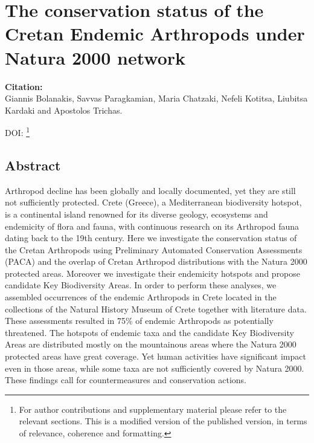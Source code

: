 % 
% 


\chapter{The conservation status of the Cretan Endemic Arthropods under Natura 2000 network}
\label{cha:arthropods}


\textbf{Citation:} \\ 
Giannis Bolanakis, Savvas Paragkamian, Maria Chatzaki, Nefeli Kotitsa, Liubitsa Kardaki and Apostolos Trichas. 

DOI: \href{https://doi.org/10.21203/rs.3.rs-2671168/v1}\footnote{
   For author contributions and supplementary material please refer to the relevant sections. 
   This is a modified version of the published version,
   in terms of relevance, coherence and formatting.
   }



\section{Abstract}

Arthropod decline has been globally and locally documented, yet they are still
not sufficiently protected. Crete (Greece), a Mediterranean biodiversity
hotspot, is a continental island renowned for its diverse geology, ecosystems
and endemicity of flora and fauna, with continuous research on its Arthropod
fauna dating back to the 19th century. Here we investigate the conservation
status of the Cretan Arthropods using Preliminary Automated Conservation
Assessments (PACA) and the overlap of Cretan Arthropod distributions with the
Natura 2000 protected areas. Moreover we investigate their endemicity hotspots
and propose candidate Key Biodiversity Areas. In order to perform these
analyses, we assembled occurrences of the endemic Arthropods in Crete located
in the collections of the Natural History Museum of Crete together with
literature data. These assessments resulted in 75\% of endemic Arthropods as
potentially threatened. The hotspots of endemic taxa and the candidate Key
Biodiversity Areas are distributed mostly on the mountainous areas where the
Natura 2000 protected areas have great coverage. Yet human activities have
significant impact even in those areas, while some taxa are not sufficiently
covered by Natura 2000. These findings call for countermeasures and conservation actions.


